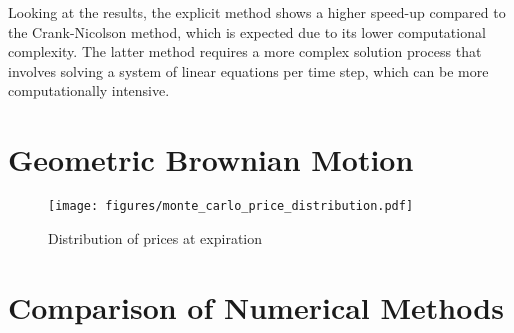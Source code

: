 Looking at the results, the explicit method shows a higher speed-up compared to the Crank-Nicolson method, which is expected due to its lower computational complexity. The latter method requires a more complex solution process that involves solving a system of linear equations per time step, which can be more computationally intensive.
\section{Geometric Brownian Motion}\label{sec:gbm_results}

\begin{figure}[H]
    \centering
    \texttt{[image: figures/monte\_carlo\_price\_distribution.pdf]}
    \caption{Distribution of prices at expiration}
    \label{fig:price-distribution}
\end{figure}

\section{Comparison of Numerical Methods}\label{sec:comparison_numerical_methods}

